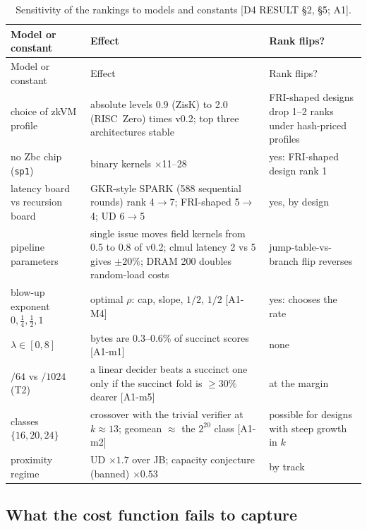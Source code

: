 \begingroup\small
\renewcommand{\arraystretch}{1.1}
\begin{longtable}{@{}>{\raggedright\arraybackslash}p{}>{\raggedright\arraybackslash}p{}>{\raggedright\arraybackslash}p{}@{}}
\caption{Sensitivity of the rankings to models and constants [D4 RESULT §2, §5; A1].}\label{tab:cost-sensitivity}\\
\toprule
Model or constant & Effect & Rank flips? \\
\midrule
\endfirsthead
\toprule
Model or constant & Effect & Rank flips? \\
\midrule
\endhead
choice of zkVM profile & absolute levels 0.9 (ZisK) to 2.0 (RISC~Zero) times v0.2; top three architectures stable & FRI-shaped designs drop 1--2 ranks under hash-priced profiles \\
no Zbc chip (\texttt{sp1}) & binary kernels $\times$11--28 & yes: FRI-shaped design rank 1 \\
latency board vs recursion board & GKR-style SPARK (588 sequential rounds) rank 4$\to$7; FRI-shaped 5$\to$4; UD 6$\to$5 & yes, by design \\
pipeline parameters & single issue moves field kernels from 0.5 to 0.8 of v0.2; clmul latency 2 vs 5 gives $\pm20\%$; DRAM 200 doubles random-load costs & jump-table-vs-branch flip reverses \\
blow-up exponent $0,\tfrac14,\tfrac12,1$ & optimal $\rho$: cap, slope, $1/2$, $1/2$ [A1-M4] & yes: chooses the rate \\
$\lambda\in[0,8]$ & bytes are 0.3--0.6\% of succinct scores [A1-m1] & none \\
$/64$ vs $/1024$ (T2) & a linear decider beats a succinct one only if the succinct fold is $\ge30\%$ dearer [A1-m5] & at the margin \\
classes $\{16,20,24\}$ & crossover with the trivial verifier at $k\approx13$; geomean $\approx$ the $2^{20}$ class [A1-m2] & possible for designs with steep growth in $k$ \\
proximity regime & UD $\times1.7$ over JB; capacity conjecture (banned) $\times0.53$ & by track \\
\bottomrule
\end{longtable}
\endgroup

\subsection{What the cost function fails to capture}\label{subsec:cost-fails}

